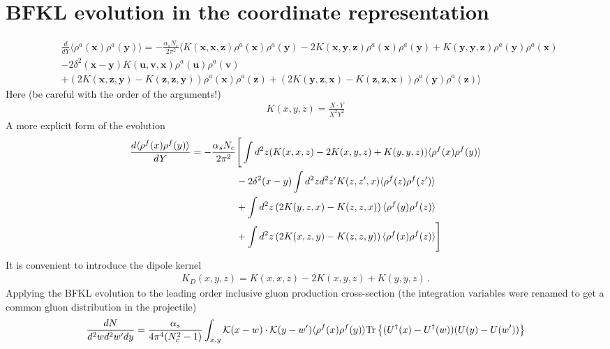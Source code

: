 \documentclass[10pt]{article}
\def\v#1{\mathbf{#1}}
\numberwithin{equation}{section}
\begin{document}
\section{BFKL evolution in the coordinate representation}


\begin{align}\label{v-bfkl}
   & \frac{d}{dY}
   \langle \rho^a(\v x)\rho^a(\v y)\rangle=
    - 
    {\frac{\alpha_s N_c}{2 \pi^2} } 
    \biggl\langle
    K(\v x,\v x,\v z)\rho^a(\v x)\rho^a(\v y)
    -2K(\v x,\v y,\v z)\rho^a(\v x)\rho^a(\v y)+K(\v y,\v y,\v z)\rho^a(\v y)\rho^a(\v x) \\
    & -2\delta^2(\v x-\v y)K(\v u,\v v,\v x)\rho^a(\v u)\rho^a(\v v)\nonumber
    \nonumber \\
    & +\left( 2 K(\v x, \v z, \v y)  - K(\v z,\v z,\v y) \right)   \rho^a(\v x)\rho^a(\v z) +\left( 2 K(\v y, \v z, \v x)  - K(\v z,\v z,\v x) \right)   \rho^a(\v y)\rho^a(\v z)\biggl\rangle 
\nonumber
\end{align}
Here (be careful with the order of the arguments!)
\begin{align}
    K(x,y,z) = \frac{X\cdot Y}{X^2 Y^2}
\end{align}
A more explicit form of the evolution 
\begin{align}
    \frac{d \langle \rho^f(x) \rho^f(y)\rangle }{dY}
    = - \frac{\alpha_s N_c}{2\pi^2} 
    &\Bigg[
    \int d^2z (  K(x,x,z) - 2 K(x,y,z)  + K(y,y,z)) \langle \rho^f(x) \rho^f(y)\rangle
    \notag \\ & 
    - 2 \delta^2(x-y) \int d^2z d^2z' K(z,z',x) \langle \rho^f(z) \rho^f(z')\rangle  
    \notag \\ & 
     + \int d^2z \left(  2 K(y,z,x) - K(z,z,x)  \right) \langle \rho^f(y) \rho^f(z)\rangle 
    \notag \\ & 
     + \int d^2z \left(  2 K(x,z,y) - K(z,z,y)  \right) \langle \rho^f(x) \rho^f(z)\rangle 
    \Bigg]
\end{align}
It is convenient to introduce the dipole kernel 
\begin{align}
    K_D(x,y,z) =  K(x,x,z) - 2 K(x,y,z)  + K(y,y,z)\,.
\end{align}
Applying the BFKL evolution to the leading order inclusive gluon production cross-section (the integration variables were renamed to get a common gluon distribution in the projectile)
\begin{align}
\label{Eq:LOx}
    \frac{dN}{d^2 w d^2 w' dy}= \frac{\alpha_s}{4 \pi^4(N_c^2-1)}
    \int_{x,y} {\cal K} (x-w) \cdot {\cal K} (y-w')  \langle \rho^f(x) \rho^f(y)\rangle {\rm Tr} \left\{  (U^\dagger(x)-U^\dagger(w)) (U(y)-U(w')) \right\}
\end{align}
\end{document}
